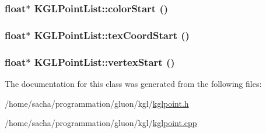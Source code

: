 \hypertarget{class_k_g_l_point_list_68ee14e7429f2390b8dd7dbb3492dec3}{
\subsubsection[{colorStart}]{\setlength{\rightskip}{0pt plus 5cm}float$\ast$ KGLPointList::colorStart ()}}
\label{class_k_g_l_point_list_68ee14e7429f2390b8dd7dbb3492dec3}


\hypertarget{class_k_g_l_point_list_173fb946e98e011a010eecaf8fb10dbf}{
\subsubsection[{texCoordStart}]{\setlength{\rightskip}{0pt plus 5cm}float$\ast$ KGLPointList::texCoordStart ()}}
\label{class_k_g_l_point_list_173fb946e98e011a010eecaf8fb10dbf}


\hypertarget{class_k_g_l_point_list_66f55a46c09cc9062c5a62279a936a09}{
\subsubsection[{vertexStart}]{\setlength{\rightskip}{0pt plus 5cm}float$\ast$ KGLPointList::vertexStart ()}}
\label{class_k_g_l_point_list_66f55a46c09cc9062c5a62279a936a09}




The documentation for this class was generated from the following files:\begin{CompactItemize}
\item 
/home/sacha/programmation/gluon/kgl/\hyperlink{kglpoint_8h}{kglpoint.h}\item 
/home/sacha/programmation/gluon/kgl/\hyperlink{kglpoint_8cpp}{kglpoint.cpp}\end{CompactItemize}
